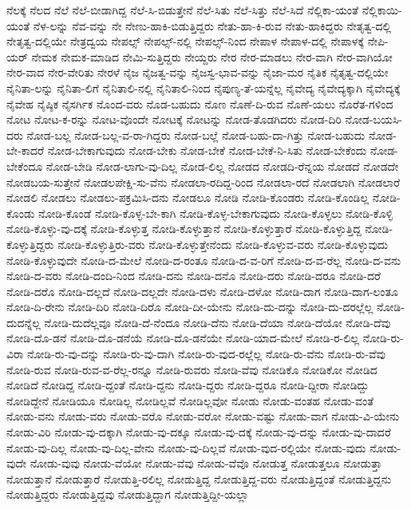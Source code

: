 {ನೆಲಕ್ಕೆ
ನೆಲದ
ನೆಲೆ
ನೆಲೆ-ಬೀಡಾಗಿದ್ದ
ನೆಲೆ-ಸಿ-ಬಿಡುತ್ತೇನೆ
ನೆಲೆ-ಸಿತು
ನೆಲೆ-ಸಿತ್ತು
ನೆಲೆ-ಸಿದೆ
ನೆಲ್ಲಿಕಾ-ಯಂತೆ
ನೆಲ್ಲಿಕಾಯಿ-ಯಂತೆ
ನೆಳ-ಲನ್ನು
ನೆವ-ವನ್ನು
ನೇ
ನೇಣು-ಹಾಕಿ-ಬಿಡುತ್ತಿದ್ದರು
ನೇತು-ಹಾ-ಕಿ-ರುವ
ನೇತು-ಹಾಕಿದ್ದರು
ನೇತೃತ್ವ-ದಲ್ಲಿ
ನೇತೃತ್ವ-ದಲ್ಲಿಯೇ
ನೇತ್ರದ್ವಯ
ನೇಪಲ್ಸ್
ನೇಪಲ್ಸ್-ನಲ್ಲಿ
ನೇಪಲ್ಸ್-ನಿಂದ
ನೇಪಾಳ
ನೇಪಾಳ-ದಲ್ಲಿ
ನೇಪಾಳಕ್ಕೆ
ನೇಪಿ-ಯರ್
ನೇಮಕ
ನೇಮಕ-ಮಾಡಿದ
ನೇಮಿ-ಸುತ್ತಿದ್ದರು
ನೇಯ್ದರು
ನೇರ
ನೇರ-ಮಾಡಲು
ನೇರ-ವಾಗಿ
ನೇರ-ವಾಗಿಯೋ
ನೇರ-ವಾದ
ನೇರ-ವೇರಿತು
ನೇರಳೆ
ನೈಜ
ನೈಜತ್ವ-ವನ್ನು
ನೈಜಸ್ವ-ಭಾವ-ವನ್ನು
ನೈಜಾ-ಮರ
ನೈತಿಕ
ನೈತೃತ್ವ-ದಲ್ಲಿಯೇ
ನೈನಿತಾ-ಲನ್ನು
ನೈನಿತಾ-ಲಿಗೆ
ನೈನಿತಾಲಿ-ನಲ್ಲಿ
ನೈನಿತಾಲಿ-ನಿಂದ
ನೈಪುಣ್ಯ-ತೆ-ಯನ್ನೆಲ್ಲ
ನೈವೇದ್ಯ
ನೈವೇದ್ಯಕ್ಕಾಗಿ
ನೈವೇದ್ಯಕ್ಕೆ
ನೈವೇಹ
ನೈಷ್ಠಿಕ
ನೈಸರ್ಗಿಕ
ನೊಂದ-ವರು
ನೊಡ-ಬಹುದು
ನೊಣ
ನೊಣೆ-ದಿ-ರುವ
ನೊಣೆ-ಯಲು
ನೊರೆತ-ಗಳಿಂದ
ನೋಟ
ನೋಟ-ಕ-ರನ್ನು
ನೋಟ-ವೊಂದೇ
ನೋಟಕ್ಕೆ
ನೋಟನ್ನು
ನೋಡ-ತೊಡಗಿದರು
ನೋಡ-ದಿರಿ
ನೋಡ-ಬಯಸಿ-ದರು
ನೋಡ-ಬಲ್ಲ
ನೋಡ-ಬಲ್ಲ-ವ-ರಾ-ಗಿದ್ದರು
ನೋಡ-ಬಲ್ಲೆ
ನೋಡ-ಬಹು-ದಾ-ಗಿತ್ತು
ನೋಡ-ಬಹುದು
ನೋಡ-ಬೇ-ಕಾದರೆ
ನೋಡ-ಬೇಕಾಗುವುದು
ನೋಡ-ಬೇಕು
ನೋಡ-ಬೇಕೆ
ನೋಡ-ಬೇಕೆ-ನಿ-ಸಿತು
ನೋಡ-ಬೇಕೆಂದು
ನೋಡ-ಬೇಕೆಂದೂ
ನೋಡ-ಬೇಡಿ
ನೋಡ-ಲಾಗು-ವು-ದಿಲ್ಲ
ನೋಡ-ಲಿಲ್ಲ
ನೋಡದ
ನೋಡದಿ-ರೆನ್ನಯ
ನೋಡದೆ
ನೋಡದೇ
ನೋಡಬಯ-ಸುತ್ತೇನೆ
ನೋಡಲಪೇಕ್ಷಿ-ಸು-ವೆನು
ನೋಡಲಾ-ರದಿದ್ದ-ರಿಂದ
ನೋಡಲಾ-ರದೆ
ನೋಡಲಾಗಿ
ನೋಡಲಾರೆ
ನೋಡಲಿ
ನೋಡಲು
ನೋಡಲು-ಪಕ್ರಮಿಸಿ-ದನು
ನೋಡಲೂ
ನೋಡಿ
ನೋಡಿ-ಕೊಂಡರು
ನೋಡಿ-ಕೊಂಡಿಲ್ಲ
ನೋಡಿ-ಕೊಂಡು
ನೋಡಿ-ಕೊಂಡೆ
ನೋಡಿ-ಕೊಳ್ಳ-ಬೇ-ಕಾಗಿ
ನೋಡಿ-ಕೊಳ್ಳ-ಬೇಕಾಗುವುದು
ನೋಡಿ-ಕೊಳ್ಳಲು
ನೋಡಿ-ಕೊಳ್ಳಿ
ನೋಡಿ-ಕೊಳ್ಳು-ವು-ದಕ್ಕೆ
ನೋಡಿ-ಕೊಳ್ಳುತ್ತ
ನೋಡಿ-ಕೊಳ್ಳುತ್ತಾನೆ
ನೋಡಿ-ಕೊಳ್ಳುತ್ತಾರೆ
ನೋಡಿ-ಕೊಳ್ಳುತ್ತಿದ್ದ
ನೋಡಿ-ಕೊಳ್ಳುತ್ತಿದ್ದರು
ನೋಡಿ-ಕೊಳ್ಳುತ್ತಿರು-ವರು
ನೋಡಿ-ಕೊಳ್ಳುತ್ತೇನೆಂದು
ನೋಡಿ-ಕೊಳ್ಳುವ-ವರು
ನೋಡಿ-ಕೊಳ್ಳುವುದು
ನೋಡಿ-ಕೊಳ್ಳುವುದೇ
ನೋಡಿ-ದ-ಮೇಲೆ
ನೋಡಿ-ದ-ರಂತೂ
ನೋಡಿ-ದ-ವ-ರಿಗೆ
ನೋಡಿ-ದ-ವ-ರೆಲ್ಲ
ನೋಡಿ-ದ-ವನು
ನೋಡಿ-ದ-ವರು
ನೋಡಿ-ದಂದಿ-ನಿಂದ
ನೋಡಿ-ದನು
ನೋಡಿ-ದನೊ
ನೋಡಿ-ದರು
ನೋಡಿ-ದರೂ
ನೋಡಿ-ದರೆ
ನೋಡಿ-ದರೊ
ನೋಡಿ-ದಲ್ಲದೆ
ನೋಡಿ-ದಲ್ಲದೇ
ನೋಡಿ-ದಳು
ನೋಡಿ-ದಳೋ
ನೋಡಿ-ದಾಗ
ನೋಡಿ-ದಾಗ-ಲಂತೂ
ನೋಡಿ-ದಿ-ರೇನು
ನೋಡಿ-ದಿರಿ
ನೋಡಿ-ದಿರೊ
ನೋಡಿ-ದೀ-ಯೇನು
ನೋಡಿ-ದು-ದನ್ನು
ನೋಡಿ-ದು-ದರಲ್ಲೆಲ್ಲ
ನೋಡಿ-ದುದನ್ನೆಲ್ಲ
ನೋಡಿ-ದುದೆಲ್ಲವೂ
ನೋಡಿ-ದೆ-ನೆಂದೂ
ನೋಡಿ-ದೆನು
ನೋಡಿ-ದೆಯಾ
ನೋಡಿ-ದೆಯೋ
ನೋಡಿ-ದೆವು
ನೋಡಿ-ದೊ-ಡನೆ
ನೋಡಿ-ದೊ-ಡನೆಯೆ
ನೋಡಿ-ದೊ-ಡನೆಯೇ
ನೋಡಿ-ಯಾದ-ಮೇಲೆ
ನೋಡಿ-ರ-ಲಿಲ್ಲ
ನೋಡಿ-ರು-ವಿರಾ
ನೋಡಿ-ರು-ವು-ದನ್ನು
ನೋಡಿ-ರು-ವು-ದಾಗಿ
ನೋಡಿ-ರು-ವುದ-ರಲ್ಲೆಲ್ಲ
ನೋಡಿ-ರು-ವೆನು
ನೋಡಿ-ರು-ವೆವು
ನೋಡಿ-ರುವ
ನೋಡಿ-ರುವ-ವ-ರೆಲ್ಲ-ರನ್ನೂ
ನೋಡಿ-ರುವರು
ನೋಡಿ-ವೆವು
ನೋಡಿಕೊ
ನೋಡಿಕೋ
ನೋಡಿದ
ನೋಡಿದೆ
ನೋಡಿದ್ದ
ನೋಡಿ-ದ್ದಂತೆ
ನೋಡಿ-ದ್ದನು
ನೋಡಿ-ದ್ದರು
ನೋಡಿ-ದ್ದರೂ
ನೋಡಿ-ದ್ದೀರಾ
ನೋಡಿದ್ದು
ನೋಡಿದ್ದೇನೆ
ನೋಡಿಯೂ
ನೋಡಿಲ್ಲ
ನೋಡಿಲ್ಲವೆ
ನೋಡಿಲ್ಲವೋ
ನೋಡು
ನೋಡು-ವಂತಹ
ನೋಡು-ವಂತೆ
ನೋಡು-ವನು
ನೋಡು-ವರು
ನೋಡು-ವರೊ
ನೋಡು-ವರೋ
ನೋಡು-ವಷ್ಟು
ನೋಡು-ವಾಗ
ನೋಡು-ವಿ-ಯೇನು
ನೋಡು-ವಿರಿ
ನೋಡು-ವು-ದಕ್ಕಾಗಿ
ನೋಡು-ವು-ದಕ್ಕೂ
ನೋಡು-ವು-ದಕ್ಕೆ
ನೋಡು-ವು-ದನ್ನು
ನೋಡು-ವು-ದಾದರೆ
ನೋಡು-ವು-ದಿಲ್ಲ
ನೋಡು-ವು-ದಿಲ್ಲ-ವೇನು
ನೋಡು-ವು-ದಿಲ್ಲವೆ
ನೋಡು-ವುದ-ರಲ್ಲಿಯೇ
ನೋಡು-ವುದು
ನೋಡು-ವುದೇ
ನೋಡು-ವುವು
ನೋಡು-ವೆಯೋ
ನೋಡು-ವೆವು
ನೋಡು-ವೆವೊ
ನೋಡುತ್ತ
ನೋಡುತ್ತಲೂ
ನೋಡುತ್ತಾ
ನೋಡುತ್ತಾನೆ
ನೋಡುತ್ತಾರೆ
ನೋಡುತ್ತಿ-ರಲಿಲ್ಲ
ನೋಡುತ್ತಿದ್ದ
ನೋಡುತ್ತಿದ್ದ-ವರು
ನೋಡುತ್ತಿದ್ದಂತೆ
ನೋಡುತ್ತಿದ್ದನು
ನೋಡುತ್ತಿದ್ದರು
ನೋಡುತ್ತಿದ್ದವು
ನೋಡುತ್ತಿದ್ದಾಗ
ನೋಡುತ್ತಿದ್ದೀ-ಯಲ್ಲಾ
}

